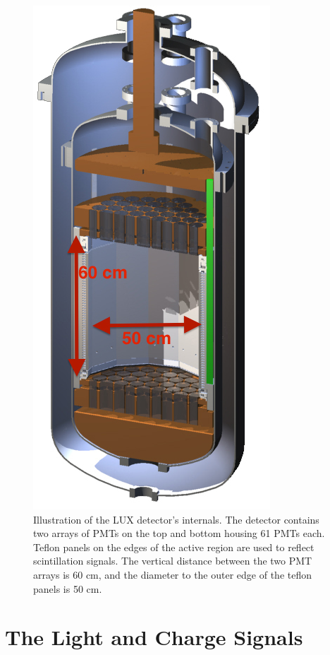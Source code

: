  \begin{figure}[h!]\centering
\includegraphics[scale=0.5]{Chapter_LUX_Det/LUX_half_rendering_white.jpg}
\caption{Illustration of the LUX detector's internals. The detector contains two arrays of PMTs on the top and bottom housing 61 PMTs each. Teflon panels on the edges of the active region are used to reflect scintillation signals. The vertical distance between the two PMT arrays is 60 cm, and the diameter to the outer edge of the teflon panels is 50 cm. }
\label{fig:LUX_TPC}
\end{figure}



\section{The Light and Charge Signals}

